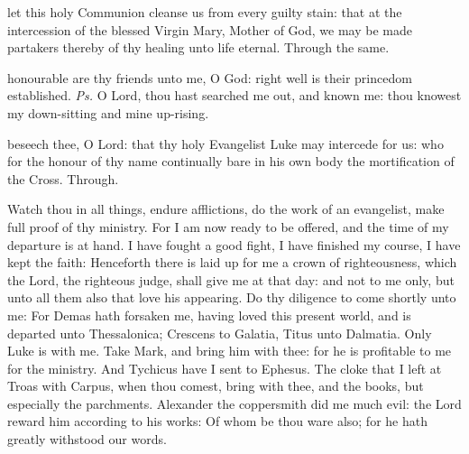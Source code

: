
\postcommunion
{} let this holy Communion cleanse us from every guilty stain: that at the intercession of the blessed Virgin Mary, Mother of God, we may be made partakers thereby of thy healing unto life eternal. Through the same.



\introit
{} honourable are thy friends unto me, O God: right well is their princedom established. \textit{Ps.} O Lord, thou hast searched me out, and known me: thou knowest my down-sitting and mine up-rising.

\collect
 beseech thee, O Lord: that thy holy Evangelist Luke may intercede for us: who for the honour of thy name continually bare in his own body the mortification of the Cross. Through.

 Watch thou in all things, endure afflictions, do the work of an evangelist, make full proof of thy ministry. For I am now ready to be offered, and the time of my departure is at hand. I have fought a good fight, I have finished my course, I have kept the faith: Henceforth there is laid up for me a crown of righteousness, which the Lord, the righteous judge, shall give me at that day: and not to me only, but unto all them also that love his appearing. Do thy diligence to come shortly unto me: For Demas hath forsaken me, having loved this present world, and is departed unto Thessalonica; Crescens to Galatia, Titus unto Dalmatia. Only Luke is with me. Take Mark, and bring him with thee: for he is profitable to me for the ministry. And Tychicus have I sent to Ephesus. The cloke that I left at Troas with Carpus, when thou comest, bring with thee, and the books, but especially the parchments. Alexander the coppersmith did me much evil: the Lord reward him according to his works: Of whom be thou ware also; for he hath greatly withstood our words.

